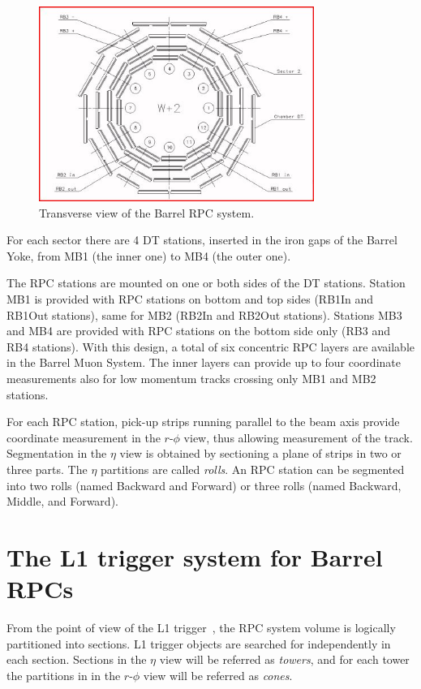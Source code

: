 \begin{figure}[hbtp]
  \begin{center}
    \includegraphics[width=0.8\textwidth]{barrel_layout}
    \hspace{1cm}
    \caption{Transverse view of the Barrel RPC system.}
    \label{fig:barrel_lay}
  \end{center}
\end{figure}

For each sector there are 4 DT stations, inserted in the 
iron gaps of the Barrel Yoke, from MB1 (the inner one)
to MB4 (the outer one). 

The RPC stations are mounted on one or both sides of the DT 
stations. Station MB1 is provided with RPC stations on 
bottom and top sides (RB1In and RB1Out stations), same 
for MB2 (RB2In and RB2Out stations). Stations MB3 and MB4
are provided with RPC stations on the bottom side only
(RB3 and RB4 stations). 
With this design, a total of six concentric RPC layers are 
available in the Barrel Muon System. The inner
layers can provide up to four coordinate measurements also for 
low momentum tracks crossing only MB1 and MB2 stations.

For each RPC station, pick-up strips running parallel to the 
beam axis provide coordinate measurement in the $r$-$\phi$ view,
thus allowing \pt measurement of the track. 
Segmentation in the $\eta$ view is obtained by sectioning
a plane of strips in two or three parts. 
The $\eta$ partitions are called {\em rolls}.
An RPC station can be segmented into two rolls (named Backward and 
Forward) or three rolls (named Backward, Middle, and Forward).

\section{The L1 trigger system for Barrel RPCs}
From the point of view of the L1 trigger~\cite{ref:trig_tdr}, 
the RPC system volume is logically partitioned into 
sections. L1 trigger objects are searched 
for independently in each section.
Sections in the $\eta$ view will be referred as {\em towers},
and for each tower the partitions in  
in the $r$-$\phi$ view will be referred as {\em cones}.

